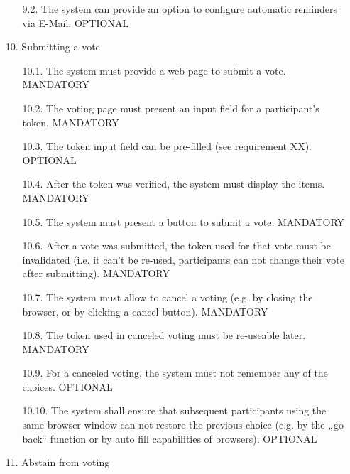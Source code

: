 \begin{enumerate}
\begin{enumerate}
	
	\item[9.2.] The system can provide an option to configure automatic reminders via E-Mail. OPTIONAL
	\end{enumerate}




\item[10.] Submitting a vote

	\begin{enumerate}
	\item[10.1.] The system must provide a web page to submit a vote. MANDATORY
	
	
	\item[10.2.] The voting page must present an input field for a participant’s token. MANDATORY
	
	
	\item[10.3.] The token input field can be pre-filled (see requirement XX). OPTIONAL
	
	
	\item[10.4.] After the token was verified, the system must display the items. MANDATORY
	
	
	\item[10.5.] The system must present a button to submit a vote. MANDATORY
	
	
	\item[10.6.] After a vote was submitted, the token used for that vote must be invalidated (i.e. it can’t be
	re-used, participants can not change their vote after submitting). MANDATORY
	
	
	\item[10.7.] The system must allow to cancel a voting (e.g. by closing the browser, or by clicking a cancel
	button). MANDATORY
	
	
	\item[10.8.] The token used in canceled voting must be re-useable later. MANDATORY
	
	
	\item[10.9.] For a canceled voting, the system must not remember any of the choices. OPTIONAL
	
	
	\item[10.10.] The system shall ensure that subsequent participants using the same browser window
	can not restore the previous choice (e.g. by the „go back“ function or by auto fill capabilities
	of browsers). OPTIONAL
	\end{enumerate}




\item[11.] Abstain from voting


\end{enumerate}
